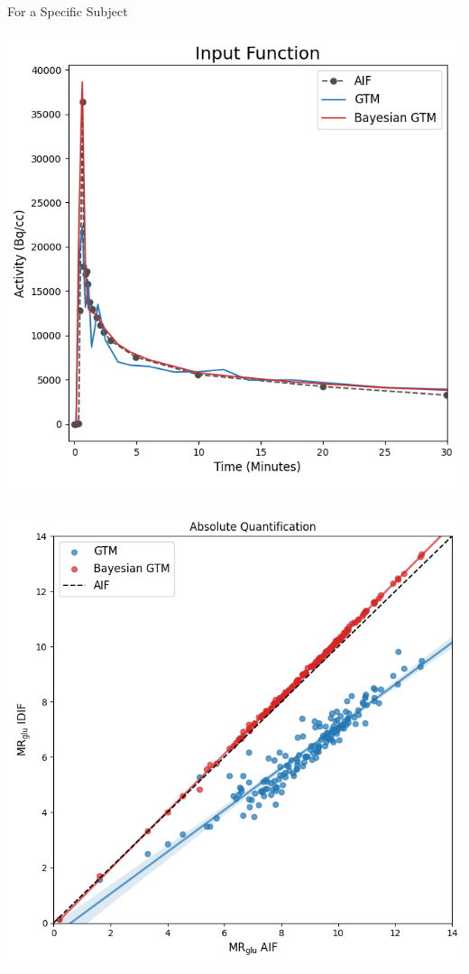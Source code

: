 \documentclass[aspectratio=169]{beamer}
\begin{document}
\begin{frame}[t]{For a Specific Subject}
	\begin{center}
		\vfill
		\begin{minipage}{0.48\textwidth}
			\centering
			\includegraphics[width=\linewidth]{BADKA07504_1_infunc_gtm_bgtm2.png}
		\end{minipage}
		\begin{minipage}{0.48\textwidth}
			\centering
			\includegraphics[width=\linewidth]{BARPH08187_1_fitk3_mrglu.png}
		\end{minipage}
		\vfill
	\end{center}
\end{frame}
\end{document}
